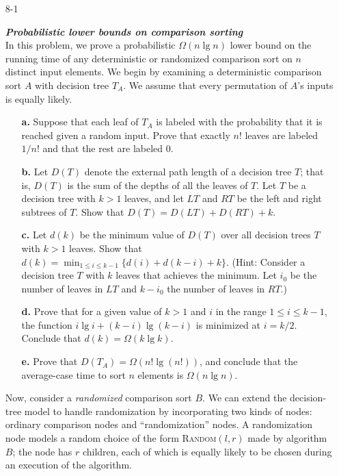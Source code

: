 \begin{enumerate}

\item[8-1]{\textbf{\emph{Probabilistic lower bounds on comparison sorting}}\\
In this problem, we prove a probabilistic $\Omega(n \lg n)$ lower bound on the
running time of any deterministic or randomized comparison sort on $n$ distinct
input elements. We begin by examining a deterministic comparison sort $A$ with
decision tree $T_A$. We assume that every permutation of $A$'s inputs is equally
likely.

\begin{enumerate}
\item[\textbf{a.}]{Suppose that each leaf of $T_A$ is labeled with the
probability that it is reached given a random input. Prove that exactly $n!$
leaves are labeled $1/n!$ and that the rest are labeled 0.}
\item[\textbf{b.}]{Let $D(T)$ denote the external path length of a decision tree
$T$; that is, $D(T)$ is the sum of the depths of all the leaves of $T$. Let $T$
be a decision tree with $k > 1$ leaves, and let $LT$ and $RT$ be the left and
right subtrees of $T$. Show that $D(T) = D(LT) + D(RT) + k$.}
\item[\textbf{c.}]{Let $d(k)$ be the minimum value of $D(T)$ over all decision
trees $T$ with $k > 1$ leaves. Show that
$d(k) = \min_{1 \le i \le k - 1} \{d(i) + d(k - i) + k\}$. (Hint: Consider
a decision tree $T$ with $k$ leaves that achieves the minimum. Let $i_0$ be the
number of leaves in $LT$ and $k - i_0$ the number of leaves in $RT$.)}
\item[\textbf{d.}]{Prove that for a given value of $k > 1$ and $i$ in the range
$1 \le i \le k - 1$, the function $i \lg i + (k - i) \lg (k - i)$ is minimized
at $i = k/2$. Conclude that $d(k) = \Omega(k \lg k)$.}
\item[\textbf{e.}]{Prove that $D(T_A) = \Omega(n! \lg(n!))$, and conclude that
the average-case time to sort $n$ elements is $\Omega(n \lg n)$.}
\end{enumerate}

Now, consider a \emph{randomized} comparison sort $B$. We can extend the
decision-tree model to handle randomization by incorporating two kinds of nodes:
ordinary comparison nodes and ``randomization'' nodes. A randomization node
models a random choice of the form \textsc{Random}$(l, r)$ made by algorithm
$B$; the node has $r$ children, each of which is equally likely to be chosen
during an execution of the algorithm.

}
\end{enumerate}
